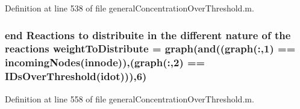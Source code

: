 Definition at line 538 of file general\+Concentration\+Over\+Threshold.\+m.

\hypertarget{a00028_a8f29aae1a516e7b27fa97f490490b59c}{
\subsubsection[{weight\+To\+Distribute}]{ {\bf end} Reactions {\bf to} distribuite in the different nature of the {\bf reactions} weight\+To\+Distribute = {\bf graph}({\bf and}(({\bf graph}(\+:,1) == {\bf incoming\+Nodes}({\bf innode})),({\bf graph}(\+:,2) == {\bf I\+Ds\+Over\+Threshold}(idot))),6)}}\label{a00028_a8f29aae1a516e7b27fa97f490490b59c}


Definition at line 558 of file general\+Concentration\+Over\+Threshold.\+m.

